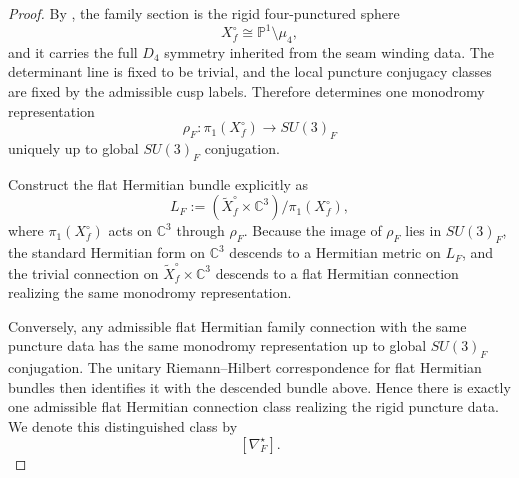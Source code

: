 
\begin{proof}
By , the family section is the rigid four-punctured sphere
\[
X_f^\circ\cong\mathbb P^1\setminus\mu_4,
\]
and it carries the full $D_4$ symmetry inherited from the seam winding data. The determinant line
is fixed to be trivial, and the local puncture conjugacy classes are fixed by the admissible cusp
labels. Therefore  determines one monodromy representation
\[
\rho_F:\pi_1(X_f^\circ)\to SU(3)_F
\]
uniquely up to global $SU(3)_F$ conjugation.

Construct the flat Hermitian bundle explicitly as
\[
L_F:=(\widetilde X_f^\circ\times\mathbb C^3)/\pi_1(X_f^\circ),
\]
where $\pi_1(X_f^\circ)$ acts on $\mathbb C^3$ through $\rho_F$. Because the image of $\rho_F$ lies
in $SU(3)_F$, the standard Hermitian form on $\mathbb C^3$ descends to a Hermitian metric on
$L_F$, and the trivial connection on $\widetilde X_f^\circ\times\mathbb C^3$ descends to a flat
Hermitian connection realizing the same monodromy representation.

Conversely, any admissible flat Hermitian family connection with the same puncture data has the same
monodromy representation up to global $SU(3)_F$ conjugation. The unitary Riemann--Hilbert
correspondence for flat Hermitian bundles then identifies it with the descended bundle above.
Hence there is exactly one admissible flat Hermitian connection class realizing the rigid puncture
data. We denote this distinguished class by
\[
[\nabla_F^\star].
\]
\end{proof}

